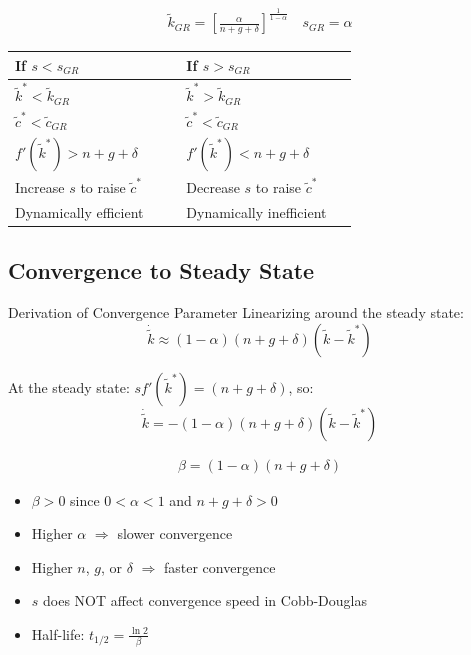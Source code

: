 \documentclass[a4paper,11pt]{article}
\newcommand{\ktilde}{\tilde{k}}
\newcommand{\ctilde}{\tilde{c}}
\begin{document}
\begin{resultbox}
\begin{align*}
\boxed{\ktilde_{GR} = \left[\frac{\alpha}{n + g + \delta}\right]^{\frac{1}{1-\alpha}}}
\quad
\boxed{s_{GR} = \alpha}
\tag{CD-GR}
\end{align*}
\end{resultbox}

\begin{tcolorbox}[colback=yellow!10,colframe=yellow!60,title=Dynamic Efficiency]
\begin{tabular}{p{0.45\linewidth}p{0.45\linewidth}}
\toprule
\textbf{If $s < s_{GR}$} & \textbf{If $s > s_{GR}$} \\
\midrule
$\ktilde^{*} < \ktilde_{GR}$ & $\ktilde^{*} > \ktilde_{GR}$ \\
$\ctilde^{*} < \ctilde_{GR}$ & $\ctilde^{*} < \ctilde_{GR}$ \\
$f'(\ktilde^{*}) > n+g+\delta$ & $f'(\ktilde^{*}) < n+g+\delta$ \\
Increase $s$ to raise $\ctilde^{*}$ & Decrease $s$ to raise $\ctilde^{*}$ \\
Dynamically efficient & Dynamically inefficient \\
\bottomrule
\end{tabular}
\end{tcolorbox}

\subsection*{Convergence to Steady State}

\begin{derivationbox}{Derivation of Convergence Parameter}
Linearizing around the steady state:
\[
\dot{\ktilde} \approx (1-\alpha)(n+g+\delta)(\ktilde - \ktilde^*)
\]

At the steady state: $sf'(\ktilde^*) = (n+g+\delta)$, so:
\[
\dot{\ktilde} = -(1-\alpha)(n+g+\delta)(\ktilde - \ktilde^*)
\]
\end{derivationbox}

\begin{resultbox}
\begin{align*}
\boxed{\beta = (1-\alpha)(n + g + \delta)}
\tag{CD-Convergence}
\end{align*}
\end{resultbox}

\begin{tcolorbox}[colback=green!5,colframe=green3,title=Properties of $\beta$]
\begin{itemize}
    \item $\beta > 0$ since $0 < \alpha < 1$ and $n+g+\delta > 0$
    \item Higher $\alpha$ $\Rightarrow$ slower convergence
    \item Higher $n$, $g$, or $\delta$ $\Rightarrow$ faster convergence
    \item $s$ does NOT affect convergence speed in Cobb-Douglas
    \item Half-life: $t_{1/2} = \frac{\ln 2}{\beta}$
\end{itemize}
\end{tcolorbox}
\end{document}
